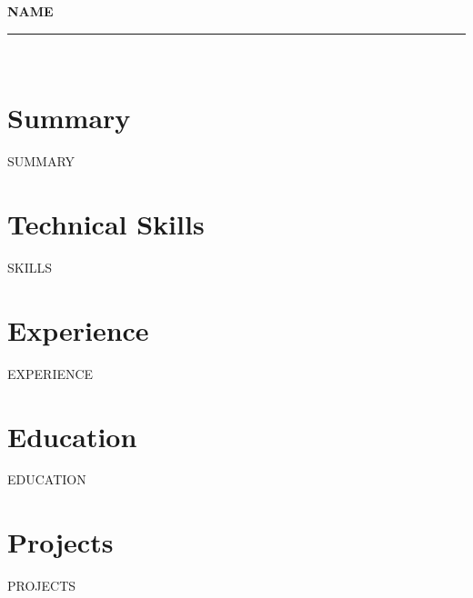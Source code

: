 \documentclass[10pt,letterpaper]{article}
\makeatletter
\newcommand{\expentry}[4]{%
  \vspace{2pt}%
  \begin{tabular*}{\textwidth}[t]{l@{\extracolsep{\fill}}r}%
    {\color{accent}\textbf{#1}} & \textit{#4} \\%
    \textit{\small #2} & {\small #3} \\%
  \end{tabular*}\par\nopagebreak\vspace{-3pt}%
}
\newcommand{\eduentry}[4]{%
  \vspace{2pt}%
  \begin{tabular*}{\textwidth}[t]{l@{\extracolsep{\fill}}r}%
    {\color{accent}\textbf{#1}} & \textit{#4} \\%
    \textit{\small #2} & {\small #3} \\%
  \end{tabular*}\par\nopagebreak\vspace{-3pt}%
}
\newcommand{\projentry}[3]{%
  \vspace{2pt}%
  \begin{tabular*}{\textwidth}[t]{l@{\extracolsep{\fill}}r}%
    {\color{accent}\textbf{#1}}\enspace---\enspace\textit{#2} & #3 \\%
  \end{tabular*}\par\nopagebreak\vspace{-3pt}%
}
\makeatother
\begin{document}
\begin{center}
  {\color{accent}\Huge\bfseries {{NAME}}}\\[4pt]
  {\color{rulecolor}\rule{0.4\textwidth}{0.4pt}}\\[4pt]
  \small
   \quad
  \href{mailto:{{EMAIL}}}{} \quad
  \href{https://linkedin.com/in/{{LINKEDIN}}}{} \quad
  \href{https://github.com/{{GITHUB}}}{} \quad
\end{center}

\vspace{3pt}

\section{Summary}
{{SUMMARY}}

\section{Technical Skills}
{{SKILLS}}

\section{Experience}
{{EXPERIENCE}}

\section{Education}
{{EDUCATION}}

\section{Projects}
{{PROJECTS}}
\end{document}
